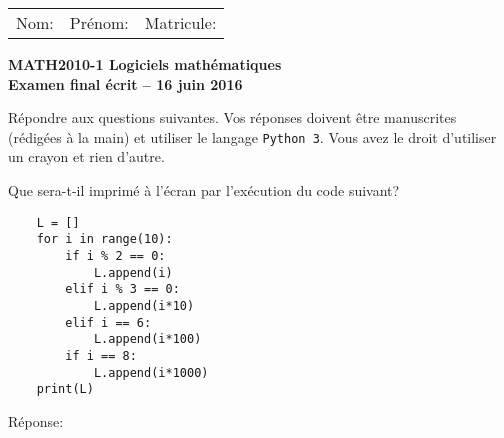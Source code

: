 




{\bfseries\sffamily
\begin{tabular}{p{5cm}p{6cm}r}
    Nom: & Prénom: & Matricule:
\end{tabular}}
\bigskip

\begin{center}
  \normalfont\sffamily\large\bfseries\color{black}
    MATH2010-1 Logiciels mathématiques\\
    Examen final écrit -- 16 juin 2016
\end{center}
\bigskip

Répondre aux questions suivantes. Vos réponses doivent être manuscrites
(rédigées à la main) et utiliser le langage \texttt{Python 3}.
Vous avez le droit d'utiliser un crayon et rien d'autre.





\begin{question}[5 pts]
Que sera-t-il imprimé à l'écran par l'exécution du code suivant?
\begin{verbatim}
    L = []
    for i in range(10):
        if i % 2 == 0:
            L.append(i)
        elif i % 3 == 0:
            L.append(i*10)
        elif i == 6:
            L.append(i*100) 
        if i == 8:
            L.append(i*1000) 
    print(L)     
\end{verbatim}
\begin{mybox}
    Réponse:\\[5pt]
\begin{reponse}
    [0, 2, 30, 4, 6, 8, 8000, 90]
\end{reponse}
\end{mybox}
\end{question}

